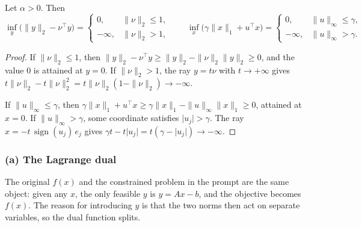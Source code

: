 \begin{lemma}
\label{lem:p7-norm-inf}
Let \(\alpha>0\). Then
\[
\inf_{y}\bigl(\|y\|_{2}-\nu^{\top}y\bigr)
=
\begin{cases}
0, & \|\nu\|_{2}\le 1,\\
-\infty, & \|\nu\|_{2}>1,
\end{cases}
\qquad
\inf_{x}\bigl(\gamma\|x\|_{1}+u^{\top}x\bigr)
=
\begin{cases}
0, & \|u\|_{\infty}\le\gamma,\\
-\infty, & \|u\|_{\infty}>\gamma.
\end{cases}
\]
\end{lemma}

\begin{proof}
If \(\|\nu\|_{2}\le 1\), then \(\|y\|_{2}-\nu^{\top}y\ge\|y\|_{2}-\|\nu\|_{2}\|y\|_{2}\ge 0\), and the value \(0\) is attained at \(y=0\). If \(\|\nu\|_{2}>1\), the ray \(y=t\nu\) with \(t\to+\infty\) gives \(t\|\nu\|_{2}-t\|\nu\|_{2}^{2}=t\|\nu\|_{2}(1-\|\nu\|_{2})\to-\infty\).

If \(\|u\|_{\infty}\le\gamma\), then \(\gamma\|x\|_{1}+u^{\top}x\ge\gamma\|x\|_{1}-\|u\|_{\infty}\|x\|_{1}\ge 0\), attained at \(x=0\). If \(\|u\|_{\infty}>\gamma\), some coordinate satisfies \(\lvert u_{j}\rvert>\gamma\). The ray \(x=-t\,\operatorname{sign}(u_{j})\,e_{j}\) gives \(\gamma t-t\lvert u_{j}\rvert=t(\gamma-\lvert u_{j}\rvert)\to-\infty\).
\end{proof}

\subsubsection{(a) The Lagrange dual}

The original \(f(x)\) and the constrained problem in the prompt are the same object: given any \(x\), the only feasible \(y\) is \(y=Ax-b\), and the objective becomes \(f(x)\). The reason for introducing \(y\) is that the two norms then act on separate variables, so the dual function splits.

